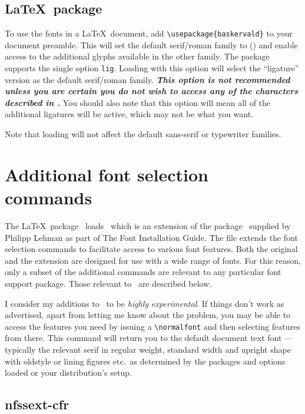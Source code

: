 \documentclass[11pt,british]{article}
\begin{document}
\subsection{\LaTeX\ package}

To use the fonts in a \LaTeX\ document, add \verb|\usepackage{baskervald}| to your document preamble. This will set the default serif/roman family to  () and enable access to the additional glyphs available in the other family. The package supports the single option \verb|lig|. Loading  with this option will select the ``ligature'' version as the default serif/roman family. \textbf{\emph{This option is not recommended unless you are \emph{certain} you do not wish to access any of the characters described in .}} You should also note that this option will mean all of the additional ligatures will be active, which may not be what you want.

Note that loading  will not affect the default sans-serif or typewriter families.
	
\section{Additional font selection commands}\label{sec:commands}

	The \LaTeX\ package \ loads \ which is an extension of the package \ supplied by Philipp Lehman as part of The Font Installation Guide. The file extends the font selection commands to facilitate access to various font features. Both the original and the extension are designed for use with a wide range of fonts. For this reason, only a subset of the additional commands are relevant to any particular font support package. Those relevant to \ are described below.
	
	I consider my additions to \ to be \emph{highly experimental}. If things don't work as advertised, apart from letting me know about the problem, you may be able to access the features you need by issuing a \verb|\normalfont| and then selecting features from there. This command will return you to the default document text font --- typically the relevant serif in regular weight, standard width and upright shape with oldstyle or lining figures etc.\ as determined by the packages and options loaded or your distribution's setup.
	
\subsection{nfssext-cfr}
\end{document}
